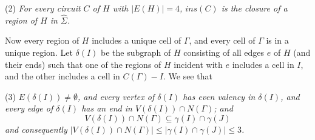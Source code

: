 \hspace*{12pt}(2) \textit{For every circuit $C$ of $H$ with $|E(H)| = 4$, $ins(C)$ is the closure of a region of $H$ in $\hat{\Sigma}$.}

Now every region of $H$ includes a unique cell of $\Gamma$, and every cell of $\Gamma$ is in a unique region. Let $\delta(I)$ be the subgraph of $H$ consisting of all edges $e$ of $H$ (and their ends) such that one of the regions of $H$ incident with $e$ includes a cell in $I$, and the other includes a cell in $C(\Gamma) - I$. We see that

\hspace*{12pt}(3) \textit{$E(\delta(I)) \ne \emptyset$, and every vertex of $\delta(I)$ has even valency in $\delta(I)$, and every edge of $\delta(I)$ has an end in $V(\delta(I)) \cap N(\Gamma)$; and}
\begin{equation*}
V(\delta(I)) \cap N(\Gamma) \subseteq \gamma(I) \cap \gamma(J)
\end{equation*}
\textit{and consequently $|V(\delta(I)) \cap N(\Gamma)| \le |\gamma(I) \cap \gamma(J)| \le 3$.}
